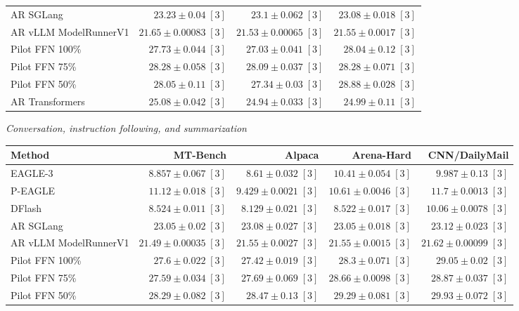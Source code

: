 \documentclass[conference,onecolumn]{IEEEtran}
\begin{document}
\begin{table}[!htp]
\begin{tabular}{@{}>{\raggedright\arraybackslash}p{3.7cm}rrr@{}}
AR \textperiodcentered{} SGLang & \(23.23 \pm 0.04\;[3]\) & \(23.1 \pm 0.062\;[3]\) & \(23.08 \pm 0.018\;[3]\) \\
AR \textperiodcentered{} vLLM ModelRunnerV1 & \(21.65 \pm 0.00083\;[3]\) & \(21.53 \pm 0.00065\;[3]\) & \(21.55 \pm 0.0017\;[3]\) \\
Pilot FFN 100\% & \(27.73 \pm 0.044\;[3]\) & \(27.03 \pm 0.041\;[3]\) & \(28.04 \pm 0.12\;[3]\) \\
Pilot FFN 75\% & \(28.28 \pm 0.058\;[3]\) & \(28.09 \pm 0.037\;[3]\) & \(28.28 \pm 0.071\;[3]\) \\
Pilot FFN 50\% & \(28.05 \pm 0.11\;[3]\) & \(27.34 \pm 0.03\;[3]\) & \(28.88 \pm 0.028\;[3]\) \\
AR \textperiodcentered{} Transformers & \(25.08 \pm 0.042\;[3]\) & \(24.94 \pm 0.033\;[3]\) & \(24.99 \pm 0.11\;[3]\) \\
\bottomrule
\end{tabular}\par\medskip
\textit{Conversation, instruction following, and summarization}\par\smallskip
\begin{tabular}{@{}>{\raggedright\arraybackslash}p{3.7cm}rrrr@{}}
\toprule
Method & MT-Bench & Alpaca & Arena-Hard & CNN/DailyMail \\
\midrule
EAGLE-3 & \(8.857 \pm 0.067\;[3]\) & \(8.61 \pm 0.032\;[3]\) & \(10.41 \pm 0.054\;[3]\) & \(\mathbf{9.987} \pm 0.13\;[3]\) \\
P-EAGLE & \(11.12 \pm 0.018\;[3]\) & \(9.429 \pm 0.0021\;[3]\) & \(10.61 \pm 0.0046\;[3]\) & \(11.7 \pm 0.0013\;[3]\) \\
DFlash & \(\mathbf{8.524} \pm 0.011\;[3]\) & \(\mathbf{8.129} \pm 0.021\;[3]\) & \(\mathbf{8.522} \pm 0.017\;[3]\) & \(10.06 \pm 0.0078\;[3]\) \\
AR \textperiodcentered{} SGLang & \(23.05 \pm 0.02\;[3]\) & \(23.08 \pm 0.027\;[3]\) & \(23.05 \pm 0.018\;[3]\) & \(23.12 \pm 0.023\;[3]\) \\
AR \textperiodcentered{} vLLM ModelRunnerV1 & \(21.49 \pm 0.00035\;[3]\) & \(21.55 \pm 0.0027\;[3]\) & \(21.55 \pm 0.0015\;[3]\) & \(21.62 \pm 0.00099\;[3]\) \\
Pilot FFN 100\% & \(27.6 \pm 0.022\;[3]\) & \(27.42 \pm 0.019\;[3]\) & \(28.3 \pm 0.071\;[3]\) & \(29.05 \pm 0.02\;[3]\) \\
Pilot FFN 75\% & \(27.59 \pm 0.034\;[3]\) & \(27.69 \pm 0.069\;[3]\) & \(28.66 \pm 0.0098\;[3]\) & \(28.87 \pm 0.037\;[3]\) \\
Pilot FFN 50\% & \(28.29 \pm 0.082\;[3]\) & \(28.47 \pm 0.13\;[3]\) & \(29.29 \pm 0.081\;[3]\) & \(29.93 \pm 0.072\;[3]\) \\

\end{tabular}
\end{table}
\end{document}
